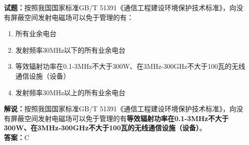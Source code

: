 \documentclass{ctexbook}
\begin{document}
\bigskip


\noindent\textbf{试题：}按照我国国家标准GB/T 51391《通信工程建设环境保护技术标准》，向没有屏蔽空间发射电磁场可以免于管理的有：
\begin{enumerate}[leftmargin=3em]
	\item 所有业余电台
	\item 发射频率30\si{\MHz}以下的所有业余电台
	\item 等效辐射功率在0.1-3\si{\MHz}不大于300W、在3\si{\MHz}-300\si{\GHz}不大于100瓦的无线通信设施（设备）
	\item 发射频率30\si{\MHz}以上的所有业余电台
\end{enumerate}
\noindent\textbf{解说：}按照我国国家标准GB/T 51391《通信工程建设环境保护技术标准》，向没有屏蔽空间发射电磁场可以免于管理的有\textbf{等效辐射功率在0.1-3\si{\MHz}不大于300W、在3\si{\MHz}-300\si{\GHz}不大于100瓦的无线通信设施（设备）}。\\\textbf{答案：}C


\bigskip


%


%
\end{document}
